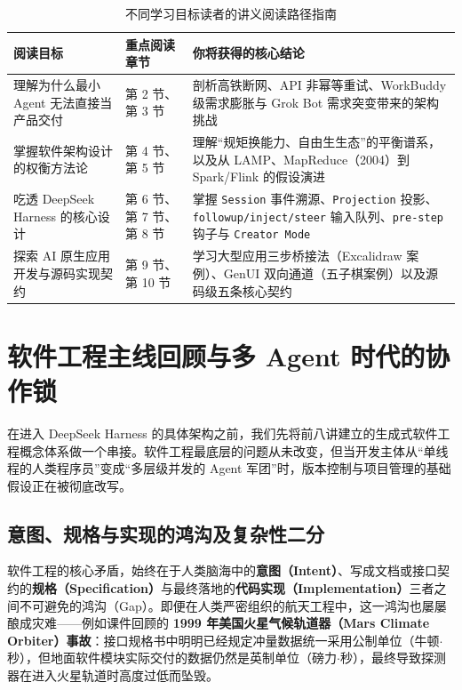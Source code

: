\documentclass[a4paper]{article}
\begin{document}
\begin{table}[H]
\centering
\small
\begin{tabular}{p{2.8cm}p{4.8cm}p{6.2cm}}
\toprule
\textbf{阅读目标} & \textbf{重点阅读章节} & \textbf{你将获得的核心结论} \\
\midrule
理解为什么最小 Agent 无法直接当产品交付 & 第 2 节、第 3 节 & 剖析高铁断网、API 非幂等重试、WorkBuddy 级需求膨胀与 Grok Bot 需求突变带来的架构挑战 \\
掌握软件架构设计的权衡方法论 & 第 4 节、第 5 节 & 理解“规矩换能力、自由生生态”的平衡谱系，以及从 LAMP、MapReduce（2004）到 Spark/Flink 的假设演进 \\
吃透 DeepSeek Harness 的核心设计 & 第 6 节、第 7 节、第 8 节 & 掌握 \texttt{Session} 事件溯源、\texttt{Projection} 投影、\texttt{followup/inject/steer} 输入队列、\texttt{pre-step} 钩子与 \texttt{Creator Mode} \\
探索 AI 原生应用开发与源码实现契约 & 第 9 节、第 10 节 & 学习大型应用三步桥接法（Excalidraw 案例）、GenUI 双向通道（五子棋案例）以及源码级五条核心契约 \\
\bottomrule
\end{tabular}
\caption{不同学习目标读者的讲义阅读路径指南}
\end{table}

\section{软件工程主线回顾与多 Agent 时代的协作锁}\label{sec:review}

在进入 DeepSeek Harness 的具体架构之前，我们先将前八讲建立的生成式软件工程概念体系做一个串接。软件工程最底层的问题从未改变，但当开发主体从“单线程的人类程序员”变成“多层级并发的 Agent 军团”时，版本控制与项目管理的基础假设正在被彻底改写。

\subsection{意图、规格与实现的鸿沟及复杂性二分}

软件工程的核心矛盾，始终在于人类脑海中的\textbf{意图（Intent）}、写成文档或接口契约的\textbf{规格（Specification）}与最终落地的\textbf{代码实现（Implementation）}三者之间不可避免的鸿沟（Gap）。即便在人类严密组织的航天工程中，这一鸿沟也屡屡酿成灾难——例如课件回顾的 \textbf{1999 年美国火星气候轨道器（Mars Climate Orbiter）事故}：接口规格书中明明已经规定冲量数据统一采用公制单位（牛顿$\cdot$秒），但地面软件模块实际交付的数据仍然是英制单位（磅力$\cdot$秒），最终导致探测器在进入火星轨道时高度过低而坠毁。
\end{document}
